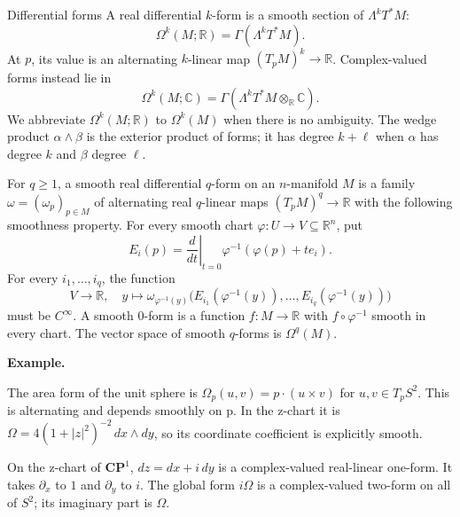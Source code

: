 \documentclass[11pt]{article}
\makeatletter
\newcommand{\R}{\mathbb R}
\newcommand{\C}{\mathbb C}
\newcounter{definition}
\newcommand{\CP}{\mathbf{CP}}
\newcommand{\exampleheading}{\par\medskip\textbf{Example.}\par\smallskip}
\newcommand{\currentdefinition}[1]{\protected@edef\@currentlabel{#1}}
\makeatother
\begin{document}
\newpage
\begin{definitionbox}{Differential forms}
\currentdefinition{\thedefinition}
\label{source:S21}
\label{def:06-07}
\label{def:B05}
A real differential $k$-form is a smooth section of $\Lambda^kT^*M$:
\[
\Omega^k(M;\R)=\Gamma(\Lambda^kT^*M).
\]
At $p$, its value is an alternating $k$-linear map $(T_pM)^k\to\R$.
Complex-valued forms instead lie in
\[
\Omega^k(M;\C)=\Gamma(\Lambda^kT^*M\otimes_{\R}\C).
\]
We abbreviate $\Omega^k(M;\R)$ to $\Omega^k(M)$ when there is no ambiguity.
The wedge product $\alpha\wedge\beta$ is the exterior product of forms;
it has degree $k+\ell$ when $\alpha$ has degree $k$ and $\beta$ degree $\ell$.


For $q\ge1$, a smooth real differential $q$-form on an $n$-manifold $M$ is a family $\omega=(\omega_p)_{p\in M}$ of alternating real $q$-linear maps $(T_pM)^q\to\R$ with the following smoothness property. For every smooth chart $\varphi:U\to V\subseteq\R^n$, put
\[E_i(p)=\left.\frac{d}{dt}\right|_{t=0}\varphi^{-1}(\varphi(p)+te_i).\]
For every $i_1,\ldots,i_q$, the function
\[V\longrightarrow\R,\quad y\longmapsto\omega_{\varphi^{-1}(y)}\bigl(E_{i_1}(\varphi^{-1}(y)),\ldots,E_{i_q}(\varphi^{-1}(y))\bigr)\]
must be $C^\infty$. A smooth $0$-form is a function $f:M\to\R$ with $f\circ\varphi^{-1}$ smooth in every chart. The vector space of smooth $q$-forms is $\Omega^q(M)$.

\exampleheading
The area form of the unit sphere is $\Omega_p(u,v)=p\cdot(u\times v)$ for $u,v\in T_pS^2$. This is alternating and depends smoothly on p. In the z-chart it is $\Omega=4(1+|z|^2)^{-2}\,dx\wedge dy$, so its coordinate coefficient is explicitly smooth.

On the z-chart of $\CP^1$, $dz=dx+i\,dy$ is a complex-valued real-linear one-form. It takes $\partial_x$ to $1$ and $\partial_y$ to $i$. The global form $i\Omega$ is a complex-valued two-form on all of $S^2$; its imaginary part is $\Omega$.
\end{definitionbox}
\end{document}
